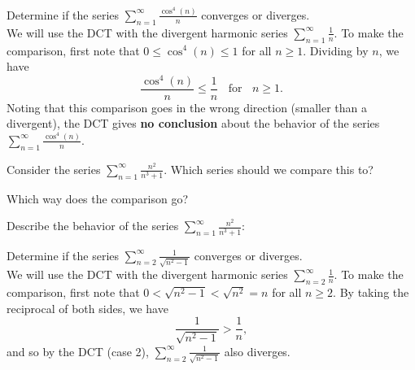 \documentclass{ximera}
\begin{document}
\begin{example}[No Conclusion] %
Determine if the series $\sum_{n=1}^\infty \frac{\cos^4(n)}{n}$ converges or diverges.\\
We will use the DCT with the divergent harmonic series $\sum_{n=1}^\infty \frac{1}{n}$. 
To make the comparison, first note that $0 \leq \cos^4(n) \leq 1$ for all $n \geq 1$. Dividing by $n$,
we have 
\[
\frac{\cos^4(n)}{n} \leq \frac{1}{n} \; \; \text{ for } \; \; n \geq 1.
\]
Noting that this comparison goes in the wrong direction (smaller than a divergent), the DCT gives \textbf{no conclusion}
about the behavior of the series $\sum_{n=1}^\infty \frac{\cos^4(n)}{n}$.
\end{example}


\begin{problem}
Consider the series $\sum_{n=1}^\infty \frac{n^2}{n^3 + 1}$.
Which series should we compare this to?

\begin{multipleChoice}
\end{multipleChoice}

Which way does the comparison go?
\begin{multipleChoice}
\end{multipleChoice}

Describe the behavior of the series $\sum_{n=1}^\infty \frac{n^2}{n^3 + 1}:$
\begin{multipleChoice}
\end{multipleChoice}

\end{problem}

\begin{example}[Divergence]
Determine if the series $\sum_{n=2}^\infty \frac{1}{\sqrt{n^2 -1}}$ converges or diverges.\\
We will use the DCT with the divergent harmonic series $\sum_{n=2}^\infty \frac{1}{n}$. 
To make the comparison, first note that $0 < \sqrt{n^2 -1} < \sqrt{n^2} = n$ for all $n \geq 2$. By taking the reciprocal of both sides,
we have 
\[
\frac{1}{\sqrt{n^2 -1}} > \frac{1}{n},
\]
and so by the DCT (case 2), $\sum_{n=2}^\infty \frac{1}{\sqrt{n^2 -1}}$ also diverges.
\end{example}
\end{document}
